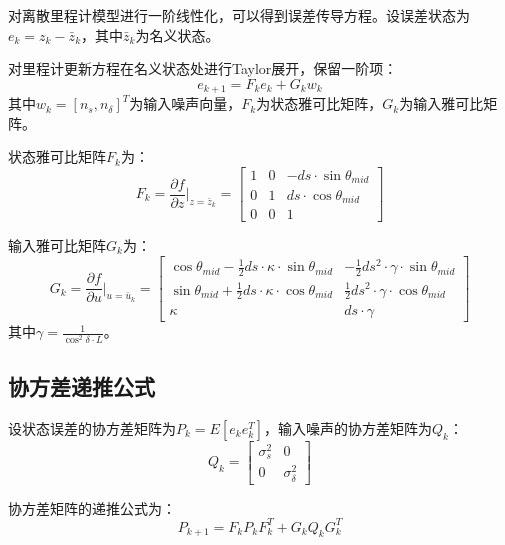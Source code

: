 \documentclass[12pt,a4paper]{article}
\begin{document}
对离散里程计模型进行一阶线性化，可以得到误差传导方程。设误差状态为$e_k = z_k - \bar{z}_k$，其中$\bar{z}_k$为名义状态。

对里程计更新方程在名义状态处进行Taylor展开，保留一阶项：
\begin{equation}
e_{k+1} = F_k e_k + G_k w_k
\end{equation}
其中$w_k = [n_s, n_\delta]^T$为输入噪声向量，$F_k$为状态雅可比矩阵，$G_k$为输入雅可比矩阵。

状态雅可比矩阵$F_k$为：
\begin{equation}
F_k = \frac{\partial f}{\partial z}\bigg|_{z=\bar{z}_k} = 
\begin{bmatrix}
1 & 0 & -ds \cdot \sin\theta_{mid} \\
0 & 1 & ds \cdot \cos\theta_{mid} \\
0 & 0 & 1
\end{bmatrix}
\end{equation}

输入雅可比矩阵$G_k$为：
\begin{equation}
G_k = \frac{\partial f}{\partial u}\bigg|_{u=\bar{u}_k} = 
\begin{bmatrix}
\cos\theta_{mid} - \frac{1}{2}ds \cdot \kappa \cdot \sin\theta_{mid} & -\frac{1}{2}ds^2 \cdot \gamma \cdot \sin\theta_{mid} \\
\sin\theta_{mid} + \frac{1}{2}ds \cdot \kappa \cdot \cos\theta_{mid} & \frac{1}{2}ds^2 \cdot \gamma \cdot \cos\theta_{mid} \\
\kappa & ds \cdot \gamma
\end{bmatrix}
\end{equation}
其中$\gamma = \frac{1}{\cos^2\delta \cdot L}$。

\subsection{协方差递推公式}

设状态误差的协方差矩阵为$P_k = E[e_k e_k^T]$，输入噪声的协方差矩阵为$Q_k$：
\begin{equation}
Q_k = 
\begin{bmatrix}
\sigma_s^2 & 0 \\
0 & \sigma_\delta^2
\end{bmatrix}
\end{equation}

协方差矩阵的递推公式为：
\begin{equation}
P_{k+1} = F_k P_k F_k^T + G_k Q_k G_k^T
\end{equation}
\end{document}

